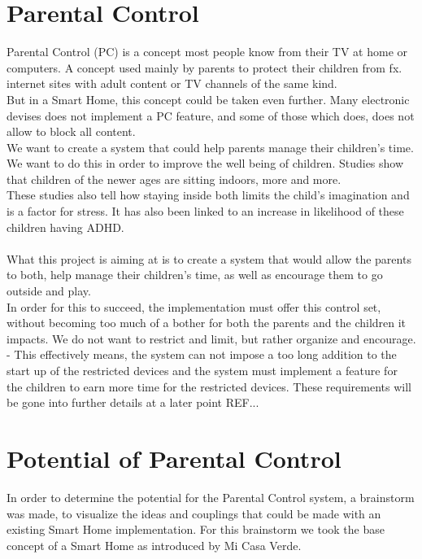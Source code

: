 \section{Parental Control}
\label{parentalControl}
Parental Control (PC) is a concept most people know from their TV at home or computers. A concept used mainly by parents to protect their children from fx. internet sites with adult content or TV channels of the same kind.\\
But in a Smart Home, this concept could be taken even further. Many electronic devises does not implement a PC feature, and some of those which does, does not allow to block all content.\\
We want to create a system that could help parents manage their children's time. We want to do this in order to improve the well being of children. Studies show that children of the newer ages are sitting indoors, more and more.\citep{childrenAndNature}\citep{leaveNoChildInside}\\
These studies also tell how staying inside both limits the child’s imagination and is a factor for stress. It has also been linked to an increase in likelihood of these children having ADHD.\\
\\
What this project is aiming at is to create a system that would allow the parents to both, help manage their children's time, as well as encourage them to go outside and play.\\
In order for this to succeed, the implementation must offer this control set, without becoming too much of a bother for both the parents and the children it impacts. We do not want to restrict and limit, but rather organize and encourage. - This effectively means, the system can not impose a too long addition to the start up of the restricted devices and the system must implement a feature for the children to earn more time for the restricted devices. These requirements will be gone into further details at a later point REF...

\section{Potential of Parental Control}
In order to determine the potential for the Parental Control system, a brainstorm was made, to visualize the ideas and couplings that could be made with an existing Smart Home implementation. For this brainstorm we took the base concept of a Smart Home as introduced by Mi Casa Verde\citep{micasaverde}.


